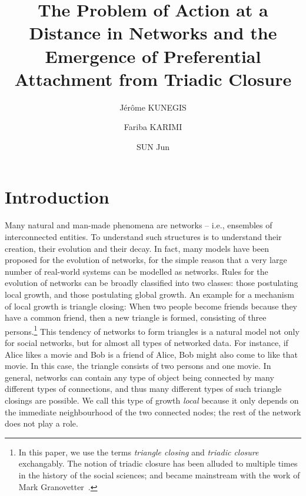 \documentclass{jimis-final-en}
\title{ The Problem of Action at a Distance in Networks and the Emergence of Preferential Attachment from Triadic Closure }
\author[*1,2]{Jérôme KUNEGIS}
\author[2,3]{Fariba KARIMI}
\author[2]{SUN Jun}
\affil[1]{University of Namur, Belgium}
\affil[2]{University of Koblenz--Landau, Germany}
\affil[3]{GESIS -- Leibniz Institute for the Social Sciences, Germany}
\begin{document}
\maketitle




\section{Introduction}

\strut
\vspace{-4ex}

Many natural and man-made phenomena are networks -- i.e., ensembles of
interconnected entities.  To understand such structures is to understand
their creation, their evolution and their decay.  In fact, many models
have been proposed for the evolution of networks, for the simple reason
that a very large number of real-world systems can be modelled as networks. 
Rules for the 
evolution of networks can be broadly classified into two classes: those
postulating local growth, and those postulating global growth.  An
example for a mechanism of local growth is triangle closing: When two
people become friends because they have a common friend, then a new
triangle is formed, consisting of three persons.\footnote{
  In this paper, we use the terms
  \emph{triangle closing} and \emph{triadic closure} exchangably.
  The notion of
  triadic closure has been alluded to multiple times in the history of
  the social sciences; and became mainstream with the work of Mark
  Granovetter~\citeyearpar{b715}.
} This tendency of 
networks to form triangles is a natural model not only for social
networks, but for almost all types of networked data.  For instance, if
Alice likes a movie and Bob is a friend of Alice, Bob might also come
to like that movie.  In this case, the triangle consists of two persons
and one movie.  In general, networks can contain any type of object
being connected by many different types of connections, and thus many
different types of such triangle closings are possible.  We call this
type of growth \emph{local} because it only depends on the immediate
neighbourhood of the two connected nodes; the rest of the network does
not play a role.
\end{document}
